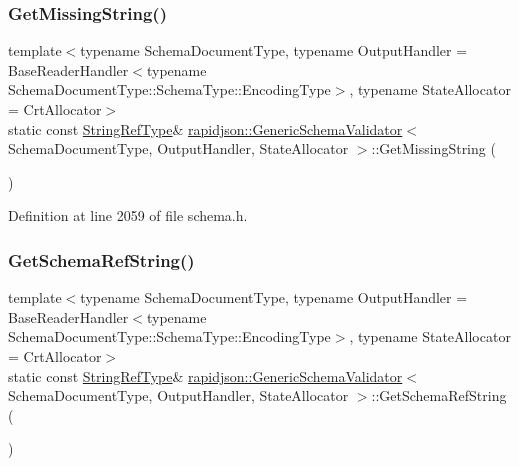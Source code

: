 \subsubsection{\texorpdfstring{GetMissingString()}{GetMissingString()}}
{\footnotesize\ttfamily template$<$typename Schema\+Document\+Type, typename Output\+Handler = Base\+Reader\+Handler$<$typename Schema\+Document\+Type\+::\+Schema\+Type\+::\+Encoding\+Type$>$, typename State\+Allocator = Crt\+Allocator$>$ \\
static const \mbox{\hyperlink{classrapidjson_1_1_generic_schema_validator_af6d33bab73e771af8c06f2b05e878350}{String\+Ref\+Type}}\& \mbox{\hyperlink{classrapidjson_1_1_generic_schema_validator}{rapidjson\+::\+Generic\+Schema\+Validator}}$<$ Schema\+Document\+Type, Output\+Handler, State\+Allocator $>$\+::Get\+Missing\+String (\begin{DoxyParamCaption}{ }\end{DoxyParamCaption})\hspace{0.3cm}{\ttfamily [static]}}



Definition at line 2059 of file schema.\+h.

\mbox{\label{classrapidjson_1_1_generic_schema_validator_af45dee59cd3d3d12ce0af37b522ccedc}} 
\subsubsection{\texorpdfstring{GetSchemaRefString()}{GetSchemaRefString()}}
{\footnotesize\ttfamily template$<$typename Schema\+Document\+Type, typename Output\+Handler = Base\+Reader\+Handler$<$typename Schema\+Document\+Type\+::\+Schema\+Type\+::\+Encoding\+Type$>$, typename State\+Allocator = Crt\+Allocator$>$ \\
static const \mbox{\hyperlink{classrapidjson_1_1_generic_schema_validator_af6d33bab73e771af8c06f2b05e878350}{String\+Ref\+Type}}\& \mbox{\hyperlink{classrapidjson_1_1_generic_schema_validator}{rapidjson\+::\+Generic\+Schema\+Validator}}$<$ Schema\+Document\+Type, Output\+Handler, State\+Allocator $>$\+::Get\+Schema\+Ref\+String (\begin{DoxyParamCaption}{ }\end{DoxyParamCaption})\hspace{0.3cm}{\ttfamily [static]}}



